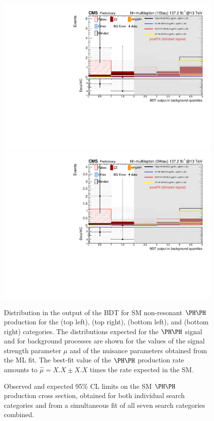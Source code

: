 \begin{figure}
  \centering\includegraphics[width=\cmsFigWidth]{figures/postFitPlots/1l_3tau.pdf}
  \centering\includegraphics[width=\cmsFigWidth]{figures/postFitPlots/0l_4tau.pdf}
  \caption{
    Distribution in the output of the BDT for SM non-resonant $\HH$ production
    for the \lllt (top left), \lltt (top right), \lttt (bottom left), and \noltttt (bottom right) categories.
    The distributions expected for the $\HH$ signal and for background processes
    are shown for the values of the signal strength parameter $\mu$ 
    and of the nuisance parameters obtained from the ML fit.
    The best-fit value of the $\HH$ production rate amounts to $\hat{\mu} = X.X \pm X.X$ 
    times the rate expected in the SM.
  }
  \label{fig:postfitPlots2}
\end{figure}

\begin{figure}
  \centering
  \caption{
    Observed and expected 95\% CL limits on the SM $\HH$ production cross section,
    obtained for both individual search categories
    and from a simultaneous fit of all seven search categories combined.
  }
  \label{fig:HH_limits_SM}
\end{figure}

